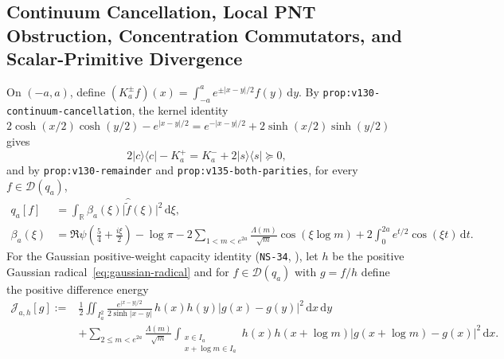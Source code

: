 \documentclass[11pt]{article}
\theoremstyle{remark}
\newcommand{\dd}{\mathrm d}
\begin{document}
\subsection{Continuum Cancellation, Local PNT Obstruction, Concentration Commutators, and Scalar-Primitive Divergence}

On $(-a,a)$, define $(K_a^\pm f)(x) = \int_{-a}^a e^{\pm|x-y|/2}f(y)\,\dd y$. By \texttt{prop:v130-continuum-cancellation}, the kernel identity $2\cosh(x/2)\cosh(y/2) - e^{|x-y|/2} = e^{-|x-y|/2} + 2\sinh(x/2)\sinh(y/2)$ gives
\begin{equation}\label{eq:continuum-cancel}
  2|c\rangle\langle c| - K_a^+ = K_a^- + 2|s\rangle\langle s| \succeq 0,
\end{equation}
and by \texttt{prop:v130-remainder} and \texttt{prop:v135-both-parities}, for every $f \in \mathcal{D}(q_a)$,
\begin{align}\label{eq:beta-symbol}
  q_a[f] &= \int_{\mathbb{R}} \beta_a(\xi)\bigl|\widehat{\widetilde{f}}(\xi)\bigr|^2\,\dd\xi, \\
  \beta_a(\xi) &= \Re\psi\!\left(\frac{5}{4} + \frac{i\xi}{2}\right) - \log\pi - 2\sum_{1 < m < e^{2a}} \frac{\Lambda(m)}{\sqrt{m}}\cos(\xi\log m) + 2\int_0^{2a} e^{t/2}\cos(\xi t)\,\dd t.\nonumber
\end{align}
For the Gaussian positive-weight capacity identity (\texttt{NS-34}, ), let $h$ be the positive Gaussian radical~\eqref{eq:gaussian-radical} and for $f \in \mathcal{D}(q_a)$ with $g = f/h$ define the positive difference energy
\begin{equation}\label{eq:v150-picone-energy}
\begin{aligned}
  \mathcal{J}_{a,h}[g] :={}& \frac{1}{2}\iint_{I_a^2} \frac{e^{|x-y|/2}}{2\sinh|x-y|}\,h(x)h(y)\bigl|g(x) - g(y)\bigr|^2\,\dd x\,\dd y \\
  &+ \sum_{2 \le m < e^{2a}} \frac{\Lambda(m)}{\sqrt{m}} \int_{\substack{x \in I_a \\ x + \log m \in I_a}} h(x)h(x+\log m)\bigl|g(x+\log m) - g(x)\bigr|^2\,\dd x.
\end{aligned}
\end{equation}
\end{document}

